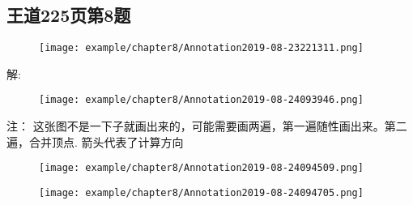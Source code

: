 \subsection{王道225页第8题}
\begin{figure}[H]
	\centering  %
	\texttt{[image: example/chapter8/Annotation2019-08-23221311.png]}
\end{figure}
解:\newline
\begin{figure}[H]
	\centering  %
	\texttt{[image: example/chapter8/Annotation2019-08-24093946.png]}
\end{figure}
注：\newline
这张图不是一下子就画出来的，可能需要画两遍，第一遍随性画出来。第二遍，合并顶点.\newline
箭头代表了计算方向\newline
\begin{figure}[H]
	\centering  %
	\texttt{[image: example/chapter8/Annotation2019-08-24094509.png]}
\end{figure}
\begin{figure}[H]
	\centering  %
	\texttt{[image: example/chapter8/Annotation2019-08-24094705.png]}
\end{figure}

